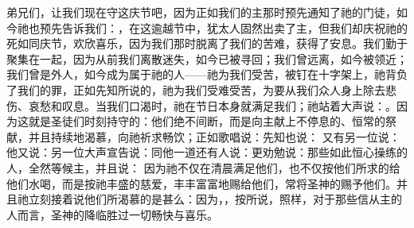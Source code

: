 \par

弟兄们，让我们现在守这庆节吧，因为正如我们的主那时预先通知了祂的门徒，如今祂也预先告诉我们：，在这逾越节中，犹太人固然出卖了主，但我们却庆祝祂的死如同庆节，欢欣喜乐，因为我们那时脱离了我们的苦难，获得了安息。我们勤于聚集在一起，因为从前我们离散迷失，如今已被寻回；我们曾远离，如今被领近；我们曾是外人，如今成为属于祂的人——祂为我们受苦，被钉在十字架上，祂背负了我们的罪，正如先知所说的，祂为我们受难受苦，为要从我们众人身上除去悲伤、哀愁和叹息。当我们口渴时，祂在节日本身就满足我们；祂站着大声说：。因为这就是圣徒们时刻持守的：他们绝不间断，而是向主献上不停息的、恒常的祭献，并且持续地渴慕，向祂祈求畅饮；正如歌唱说：先知也说： 又有另一位说：他又说：另一位大声宣告说：同他一道还有人说：更劝勉说：那些如此恒心操练的人，全然等候主，并且说： 因为祂不仅在清晨满足他们，也不仅按他们所求的给他们水喝，而是按祂丰盛的慈爱，丰丰富富地赐给他们，常将圣神的赐予他们。并且祂立刻接着说他们所渴慕的是甚么：因为，，按所说，照样，对于那些信从主的人而言，圣神的降临胜过一切畅快与喜乐。\par

